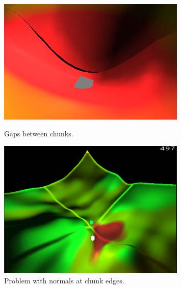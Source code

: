 \begin{figure}[H]
    \centering
    \begin{minipage}{0.45\textwidth}
        \centering
        \includegraphics[width=0.8\textwidth]{chapters/terrain_generation/resources/chunk_edges_gaps.png}
        \caption{Gaps between chunks.}
        \label{fig:gaps_between_chunks}
    \end{minipage}\hfill
    \begin{minipage}{0.45\textwidth}
        \centering
        \includegraphics[width=0.8\textwidth]{chapters/terrain_generation/resources/chunk_edges_normals_problem.png}
        \caption{Problem with normals at chunk edges.}
        \label{fig:problem_with_normals_at_chunk_edge}
    \end{minipage}
\end{figure}